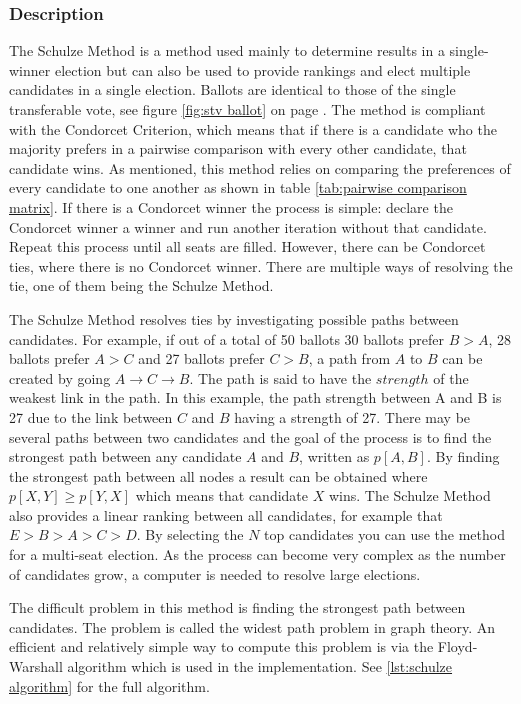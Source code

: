 \documentclass[12pt]{article}
\begin{document}
\subsubsection{Description}
The Schulze Method is a method used mainly to determine results in a single-winner election but can also be used to provide rankings and elect multiple candidates in a single election. Ballots are identical to those of the single transferable vote, see figure \ref{fig:stv ballot} on page \pageref{fig:stv ballot}. The method is compliant with the Condorcet Criterion, which means that if there is a candidate who the majority prefers in a pairwise comparison with every other candidate, that candidate wins. As mentioned, this method relies on comparing the preferences of every candidate to one another as shown in table \ref{tab:pairwise comparison matrix}. If there is a Condorcet winner the process is simple: declare the Condorcet winner a winner and run another iteration without that candidate. Repeat this process until all seats are filled. However, there can be Condorcet ties, where there is no Condorcet winner. There are multiple ways of resolving the tie, one of them being the Schulze Method.

The Schulze Method resolves ties by investigating possible paths between candidates. For example, if out of a total of 50 ballots 30 ballots prefer $B>A$, 28 ballots prefer $A>C$ and 27 ballots prefer $C>B$, a path from $A$ to $B$ can be created by going $A \rightarrow C \rightarrow B$. The path is said to have the $strength$ of the weakest link in the path. In this example, the path strength between A and B is 27 due to the link between $C$ and $B$ having a strength of 27. There may be several paths between two candidates and the goal of the process is to find the strongest path between any candidate $A$ and $B$, written as $p[A,B]$. By finding the strongest path between all nodes a result can be obtained where $p[X,Y] \geq p[Y,X]$ which means that candidate $X$ wins. The Schulze Method also provides a linear ranking between all candidates, for example that $E > B > A > C > D$. By selecting the $N$ top candidates you can use the method for a multi-seat election. As the process can become very complex as the number of candidates grow, a computer is needed to resolve large elections.

The difficult problem in this method is finding the strongest path between candidates. The problem is called the widest path problem in graph theory. An efficient and relatively simple way to compute this problem is via the Floyd-Warshall algorithm which is used in the implementation. See \ref{lst:schulze algorithm} for the full algorithm.
\end{document}
